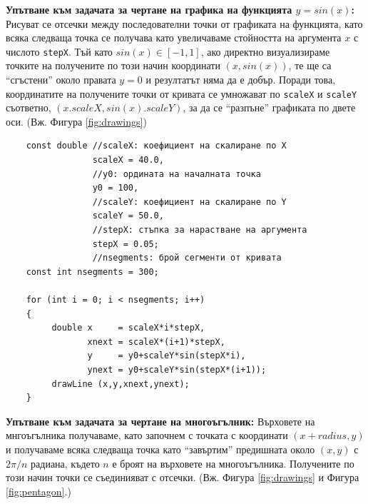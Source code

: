 \documentclass[12pt,a4paper]{article}
\newcommand{\code}[1]{\texttt{#1}}
\begin{document}
{\begin{enumerate}[resume]
  \begin{mdframed}[hidealllines=true,backgroundcolor=gray!20]
    \textbf {Упътване към задачата за чертане на графика на функцията $y=sin(x)$:} Рисуват се отсечки между последователни точки от графиката на функцията, като всяка следваща точка се получава като увеличаваме стойността на аргумента $x$ с числото \code{stepX}. Тъй като $sin(x)\in[-1,1]$, ако директно визуализираме точките на получените по този начин координати $(x,sin(x))$, те ще са ``сгъстени'' около правата $y=0$ и резултатът няма да е добър. Поради това, координатите на получените  точки от кривата се умножават по \code{scaleX} и \code{scaleY} съответно, $(x.scaleX,sin(x).scaleY)$, за да се ``разпъне'' графиката по двете оси. (Вж. Фигура \ref{fig:drawings})\\

    \begin{mdframed}[hidealllines=true,backgroundcolor=lightgray!20]
    \begin{verbatim}
    const double //scaleX: коефициент на скалиране по X
                 scaleX = 40.0,
                 //y0: ордината на началната точка
                 y0 = 100,
                 //scaleY: коефициент на скалиране по Y
                 scaleY = 50.0,
                 //stepX: стъпка за нарастване на аргумента
                 stepX = 0.05;
                 //nsegments: брой сегменти от кривата
    const int nsegments = 300;

    for (int i = 0; i < nsegments; i++)
    {
         double x     = scaleX*i*stepX,
                xnext = scaleX*(i+1)*stepX,
                y     = y0+scaleY*sin(stepX*i),
                ynext = y0+scaleY*sin(stepX*(i+1));
         drawLine (x,y,xnext,ynext);
    }
    \end{verbatim}
    \end{mdframed}

    \end{mdframed}

    \begin{mdframed}[hidealllines=true,backgroundcolor=gray!20]

    \textbf {Упътване към задачата за чертане на многоъгълник:} Върховете на мнгоъгълника получаваме, като започнем с точката с координати $(x+radius,y)$ и получаваме всяка следваща точка като ``завъртим'' предишната около $(x,y)$ с $2\pi/n$ радиана, където $n$ е броят на върховете на многоъгълника. Получените по този начин точки се съединияват с отсечки. (Вж. Фигура \ref{fig:drawings} и Фигура \ref{fig:pentagon}.)\\


\end{mdframed}
\end{enumerate}}
\end{document}
